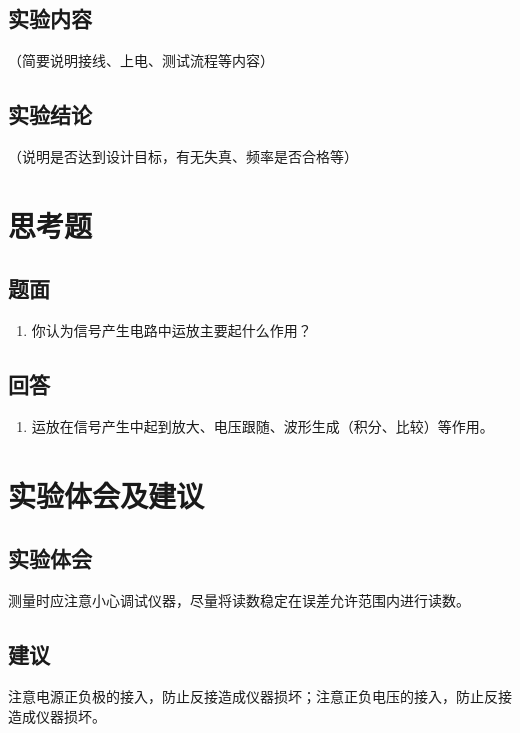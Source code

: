 \documentclass[12pt, a4paper]{article}
\begin{document}
\subsection{实验内容}
（简要说明接线、上电、测试流程等内容）

\subsection{实验结论}
（说明是否达到设计目标，有无失真、频率是否合格等）

\clearpage
\section{思考题}

\subsection{题面}
\begin{enumerate}[leftmargin=50pt, label=(\arabic*)]
    \item 你认为信号产生电路中运放主要起什么作用？
\end{enumerate}

\subsection{回答}
\begin{enumerate}[leftmargin=50pt, label=(\arabic*)]
    \item 运放在信号产生中起到放大、电压跟随、波形生成（积分、比较）等作用。
\end{enumerate}

\clearpage
\section{实验体会及建议}

\subsection{实验体会}
测量时应注意小心调试仪器，尽量将读数稳定在误差允许范围内进行读数。

\subsection{建议}
注意电源正负极的接入，防止反接造成仪器损坏；注意正负电压的接入，防止反接造成仪器损坏。
\end{document}

